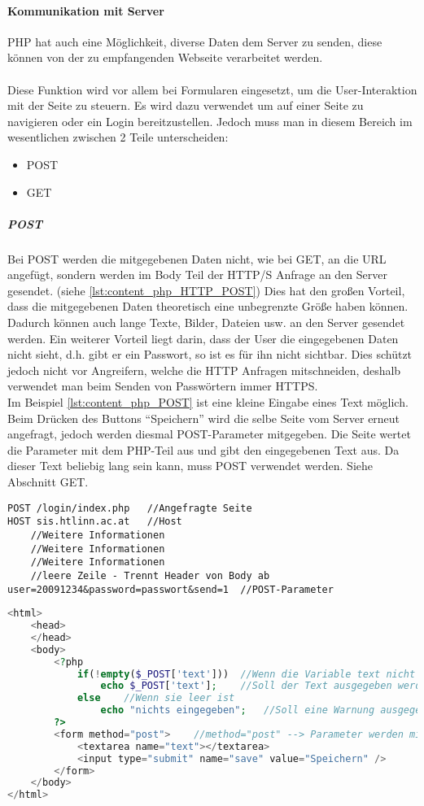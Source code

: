 \paragraph{Kommunikation mit Server}
PHP hat auch eine Möglichkeit, diverse Daten dem Server zu 
senden, diese können von der zu empfangenden Webseite verarbeitet werden.\\\\
Diese Funktion wird vor allem bei Formularen eingesetzt, um die User-Interaktion mit der Seite zu steuern. Es wird dazu verwendet um auf einer Seite zu navigieren oder ein Login bereitzustellen. Jedoch muss man in diesem Bereich im wesentlichen zwischen 2 Teile unterscheiden:
\begin{itemize}
    \item POST
    \item GET
\end{itemize}
\subparagraph{POST\\}
Bei POST werden die mitgegebenen Daten nicht, wie bei GET, an die URL angefügt, sondern werden im Body Teil der HTTP/S Anfrage an den Server gesendet. (siehe \autoref{lst:content_php_HTTP_POST}) Dies hat den großen Vorteil, dass die mitgegebenen Daten theoretisch eine unbegrenzte Größe haben können. Dadurch können auch lange Texte, Bilder, Dateien usw. an den Server gesendet werden. Ein weiterer Vorteil liegt darin, dass der User die eingegebenen Daten nicht sieht, d.h. gibt er ein Passwort, so ist es für ihn nicht sichtbar. Dies schützt jedoch nicht vor Angreifern, welche die HTTP Anfragen mitschneiden, deshalb verwendet man beim Senden von Passwörtern immer HTTPS.\\
Im Beispiel \autoref{lst:content_php_POST} ist eine kleine Eingabe eines Text möglich. Beim Drücken des Buttons \enquote{Speichern} wird die selbe Seite vom Server erneut angefragt, jedoch werden diesmal POST-Parameter mitgegeben. Die Seite wertet die Parameter mit dem PHP-Teil aus und gibt den eingegebenen Text aus. Da dieser Text beliebig lang sein kann, muss POST verwendet werden. Siehe Abschnitt GET.
\begin{lstlisting}[style=custom, caption={Ausschnitt HTTP POST Request},label={lst:content_php_HTTP_POST}]
POST /login/index.php	//Angefragte Seite
HOST sis.htlinn.ac.at	//Host
	//Weitere Informationen
	//Weitere Informationen
	//Weitere Informationen
	//leere Zeile - Trennt Header von Body ab
user=20091234&password=passwort&send=1	//POST-Parameter
\end{lstlisting}
\begin{lstlisting}[style=custom, language=PHP, caption={Beispiel POST},label={lst:content_php_POST}]
<html>
	<head>
	</head>
	<body>
		<?php
			if(!empty($_POST['text']))	//Wenn die Variable text nicht leer ist
				echo $_POST['text'];	//Soll der Text ausgegeben werden
			else	//Wenn sie leer ist
				echo "nichts eingegeben";	//Soll eine Warnung ausgegeben werden
		?>
		<form method="post">	//method="post" --> Parameter werden mit POST mitgegeben
			<textarea name="text"></textarea>
			<input type="submit" name="save" value="Speichern" />
		</form>
	</body>
</html>
\end{lstlisting}
